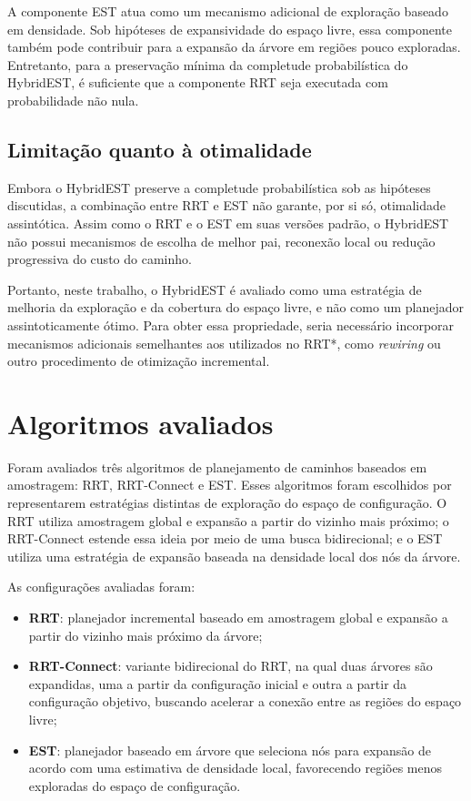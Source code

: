 A componente EST atua como um mecanismo adicional de exploração baseado em densidade. Sob hipóteses de expansividade do espaço livre, essa componente também pode contribuir para a expansão da árvore em regiões pouco exploradas. Entretanto, para a preservação mínima da completude probabilística do HybridEST, é suficiente que a componente RRT seja executada com probabilidade não nula.

\subsection{Limitação quanto à otimalidade}
\label{subsec:otimalidade_hybridest}

Embora o HybridEST preserve a completude probabilística sob as hipóteses discutidas, a combinação entre RRT e EST não garante, por si só, otimalidade assintótica. Assim como o RRT e o EST em suas versões padrão, o HybridEST não possui mecanismos de escolha de melhor pai, reconexão local ou redução progressiva do custo do caminho.

Portanto, neste trabalho, o HybridEST é avaliado como uma estratégia de melhoria da exploração e da cobertura do espaço livre, e não como um planejador assintoticamente ótimo. Para obter essa propriedade, seria necessário incorporar mecanismos adicionais semelhantes aos utilizados no RRT*, como \textit{rewiring} ou outro procedimento de otimização incremental.

\fi

\section{Algoritmos avaliados}
\label{sec:algoritmos_avaliados}

Foram avaliados três algoritmos de planejamento de caminhos baseados em amostragem: RRT, RRT-Connect e EST. Esses algoritmos foram escolhidos por representarem estratégias distintas de exploração do espaço de configuração. O RRT utiliza amostragem global e expansão a partir do vizinho mais próximo; o RRT-Connect estende essa ideia por meio de uma busca bidirecional; e o EST utiliza uma estratégia de expansão baseada na densidade local dos nós da árvore.

As configurações avaliadas foram:

\begin{itemize}
    \item \textbf{RRT}: planejador incremental baseado em amostragem global e expansão a partir do vizinho mais próximo da árvore;

    \item \textbf{RRT-Connect}: variante bidirecional do RRT, na qual duas árvores são expandidas, uma a partir da configuração inicial e outra a partir da configuração objetivo, buscando acelerar a conexão entre as regiões do espaço livre;

    \item \textbf{EST}: planejador baseado em árvore que seleciona nós para expansão de acordo com uma estimativa de densidade local, favorecendo regiões menos exploradas do espaço de configuração.
\end{itemize}


